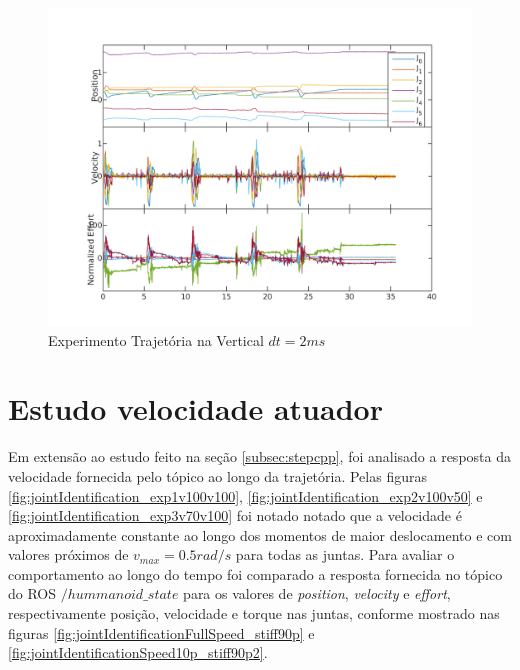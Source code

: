 \vspace{1cm}

\begin{figure}[H]
    \centering
    \includegraphics[width=0.6\linewidth,trim={2cm 1cm 2cm 2cm}]{tex/figs/moveUp3stateEvalv70s50.png}
    \caption{Experimento Trajetória na Vertical $dt=2ms$ }
    \label{fig:moveUp3}
\end{figure}


\section{Estudo velocidade atuador}

Em extensão ao estudo feito na seção \ref{subsec:stepcpp}, foi analisado a resposta da velocidade fornecida pelo tópico ao longo da trajetória. Pelas figuras \ref{fig:jointIdentification_exp1v100v100}, \ref{fig:jointIdentification_exp2v100v50} e \ref{fig:jointIdentification_exp3v70v100} foi notado notado que a velocidade é aproximadamente constante ao longo dos momentos de maior deslocamento e com valores próximos de $v_{max} = 0.5 rad/s$ para todas as juntas. Para avaliar o comportamento ao longo do tempo foi comparado a resposta fornecida no tópico do ROS $/hummanoid\_state$ para os valores de \textit{position}, \textit{velocity} e \textit{effort}, respectivamente posição, velocidade e torque nas juntas, conforme mostrado nas figuras \ref{fig:jointIdentificationFullSpeed_stiff90p} e \ref{fig:jointIdentificationSpeed10p_stiff90p2}.

